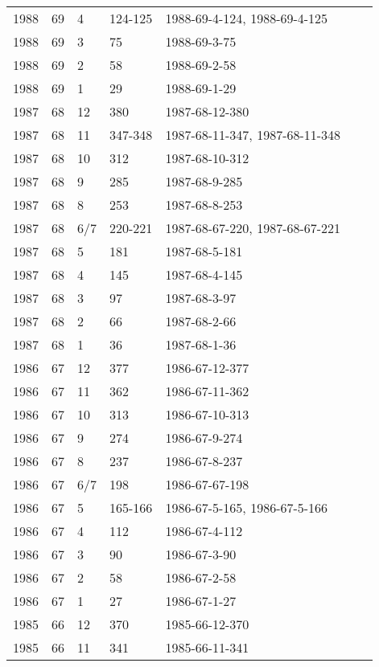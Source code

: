 \begin{longtable}{ |l|l|l|l|p{2.7cm}|l|p{2cm}| }
 1988 & 69 &     4 & 124-125 & 1988-69-4-124, 1988-69-4-125 &  & \\
 1988 & 69 &     3 &     75  & 1988-69-3-75   &  & \\
 1988 & 69 &     2 &     58  & 1988-69-2-58   &  & \\
 1988 & 69 &     1 &     29  & 1988-69-1-29   &  & \\
 1987 & 68 &    12 &    380  & 1987-68-12-380 &  & \\
 1987 & 68 &    11 & 347-348 & 1987-68-11-347, 1987-68-11-348 &  & \\
 1987 & 68 &    10 &   312   & 1987-68-10-312 &  & \\
 1987 & 68 &     9 &    285  & 1987-68-9-285  &  & \\
 1987 & 68 &     8 &    253  & 1987-68-8-253  &  & \\
 1987 & 68 &   6/7 & 220-221 & 1987-68-67-220, 1987-68-67-221 &  & \\
 1987 & 68 &     5 &   181   & 1987-68-5-181  &  & \\
 1987 & 68 &     4 &    145  & 1987-68-4-145  &  & \\
 1987 & 68 &     3 &    97   & 1987-68-3-97   &  & \\
 1987 & 68 &     2 &    66   & 1987-68-2-66   &  & \\
 1987 & 68 &     1 &   36    & 1987-68-1-36   &  & \\
 1986 & 67 &    12 &    377  & 1986-67-12-377 &  & \\
 1986 & 67 &    11 &    362  & 1986-67-11-362 &  & \\
 1986 & 67 &    10 &    313  & 1986-67-10-313 &  & \\
 1986 & 67 &     9 &    274  & 1986-67-9-274  &  & \\
 1986 & 67 &     8 &    237  & 1986-67-8-237  &  & \\
 1986 & 67 &   6/7 &    198  & 1986-67-67-198 &  & \\
 1986 & 67 &     5 & 165-166 & 1986-67-5-165, 1986-67-5-166  &  & \\
 1986 & 67 &     4 &    112  & 1986-67-4-112  &  & \\
 1986 & 67 &     3 &     90  & 1986-67-3-90   &  & \\
 1986 & 67 &     2 &     58  & 1986-67-2-58   &  & \\
 1986 & 67 &     1 &     27  & 1986-67-1-27   &  & \\
 1985 & 66 &    12 &    370  & 1985-66-12-370 &  & \\
 1985 & 66 &    11 &    341  & 1985-66-11-341 &  & \\

\end{longtable}
